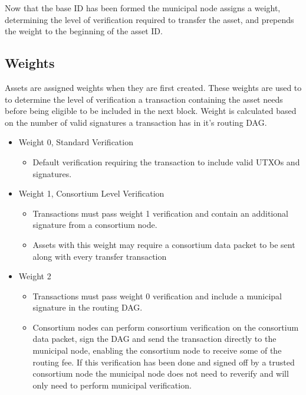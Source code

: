 \documentclass[12pt]{article}
\begin{document}



Now that the base ID has been formed the municipal node assigns 
a weight, determining the level of verification required to transfer 
the asset, and prepends the weight to the beginning of the asset ID.

\subsection{Weights}

Assets are assigned weights when they are first created. These weights are used to
to determine the level of verification a transaction containing the asset needs before
being eligible to be
included in the next block. Weight is calculated based on the number of valid signatures
a transaction has in it's routing DAG.


\begin{itemize}
	\item Weight 0, Standard Verification
		\begin{itemize}
			\item{Default verification requiring the transaction to include
				valid UTXOs and signatures.}
		\end{itemize}
	\item Weight 1, Consortium Level Verification
		\begin{itemize}
			\item{Transactions must pass weight 1 verification and contain an
				additional signature from a consortium node.}
			\item{Assets with this weight may require a consortium data packet
				to be sent along with every transfer transaction}
		\end{itemize}
	\item Weight 2
		\begin{itemize}
			\item{Transactions must pass weight 0 verification and include a 
				municipal signature in the routing DAG.}
			\item{Consortium nodes can perform consortium verification on
				the consortium data packet, sign the DAG and send the
				transaction directly to the municipal node, enabling
				the consortium node to receive some of the routing fee.
				If this verification has been done and signed off by
				a trusted consortium node the municipal node does not
				need to reverify and will only need to
				perform municipal verification.}
		\end{itemize}
\end{itemize}
\end{document}
